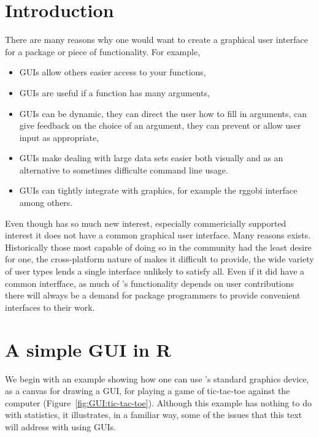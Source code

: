 



\section{Introduction}
\label{sec:GUI:introduction}
There are many reasons why one would want to create a graphical user
interface for a package or piece of \R\/ functionality. For example,
\begin{itemize}
\item GUIs allow others easier access to your functions,
\item GUIs are useful if a function has many arguments,
\item GUIs can be dynamic, they can direct the user how to fill in
  arguments, can give feedback on the choice of an argument, they can
  prevent or allow user input as appropriate,
\item GUIs make dealing with large data sets easier both visually and
  as an alternative to sometimes difficulte command line usage.
\item GUIs can tightly integrate with graphics, for example the
  rggobi interface among others.
\end{itemize}
Even though \R\/ has so much new interest, especially commericially
supported interest it does not have a common graphical user
interface. Many reasons exists. Historically those most capable of
doing so in the \R\/ community had the least desire for one, the
cross-platform nature of \R\/ makes it difficult to provide, the wide
variety of user types lends a single interface unlikely to satisfy
all. Even if it did have a common interfface, as much of \R's
functionality depends on user contributions there will always be a
demand for package programmers to provide convenient interfaces to
their work. 



\section{A simple GUI in R}
\label{sec:GUI:tic-tac-toe}

We begin with an example showing how one can use \R's standard
graphics device, as a canvas for drawing a GUI, for playing a game of
tic-tac-toe against the computer (Figure~\ref{fig:GUI:tic-tac-toe}). Although this example
has nothing to do with statistics, it illustrates, in a familiar way,
some of the issues that this text will address with using GUIs. 



